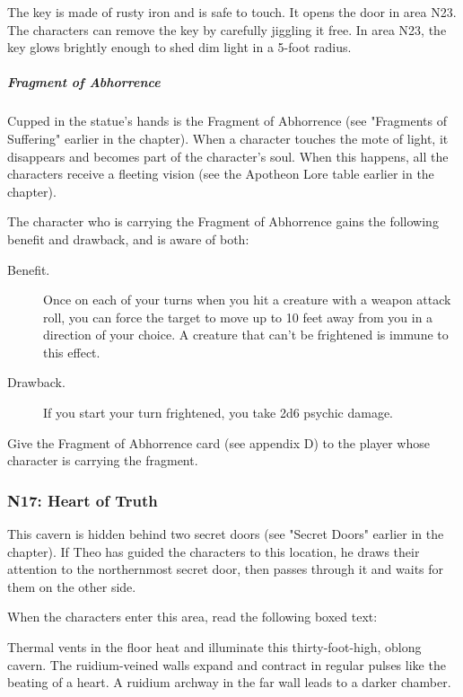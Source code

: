 \documentclass[10pt,a4paper,twoside,fancy,bg=print,twocolumn,openany,nodeprecatedcode]{dndbook}
\begin{document}
The key is made of rusty iron and is safe to touch. It opens the door in area N23. The characters can remove the key by carefully jiggling it free. In area N23, the key glows brightly enough to shed dim light in a 5-foot radius.

\subparagraph{Fragment of Abhorrence}
Cupped in the statue's hands is the Fragment of Abhorrence (see "Fragments of Suffering" earlier in the chapter). When a character touches the mote of light, it disappears and becomes part of the character's soul. When this happens, all the characters receive a fleeting vision (see the Apotheon Lore table earlier in the chapter).

The character who is carrying the Fragment of Abhorrence gains the following benefit and drawback, and is aware of both:



\begin{description}
\item[Benefit.]
Once on each of your turns when you hit a creature with a weapon attack roll, you can force the target to move up to 10 feet away from you in a direction of your choice. A creature that can't be frightened is immune to this effect.
\item[Drawback.]
If you start your turn frightened, you take 2d6 psychic damage.
\end{description}





Give the Fragment of Abhorrence card (see appendix D) to the player whose character is carrying the fragment.

\subsubsection{N17: Heart of Truth}
This cavern is hidden behind two secret doors (see "Secret Doors" earlier in the chapter). If Theo has guided the characters to this location, he draws their attention to the northernmost secret door, then passes through it and waits for them on the other side.

When the characters enter this area, read the following boxed text:

\begin{DndReadAloud}{}
Thermal vents in the floor heat and illuminate this thirty-foot-high, oblong cavern. The ruidium-veined walls expand and contract in regular pulses like the beating of a heart. A ruidium archway in the far wall leads to a darker chamber.

\end{DndReadAloud}
\end{document}
